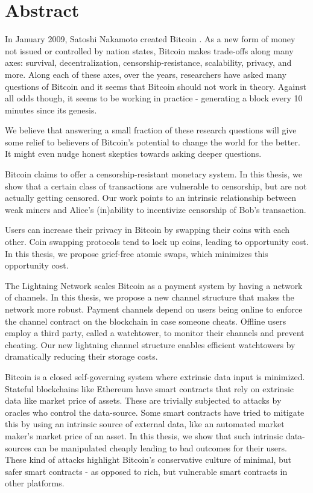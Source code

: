 
\chapter*{Abstract}

In January 2009, Satoshi Nakamoto created Bitcoin \cite{bitcoin_whitepaper}. As a new form of money not issued or controlled by nation states, Bitcoin makes trade-offs along many axes: survival, decentralization, censorship-resistance, scalability, privacy, and more. Along each of these axes, over the years, researchers have asked many questions of Bitcoin and it seems that Bitcoin should not work in theory. Against all odds though, it seems to be working in practice - generating a block every 10 minutes since its genesis.

We believe that answering a small fraction of these research questions will give some relief to believers of Bitcoin's potential to change the world for the better. It might even nudge honest skeptics towards asking deeper questions.

Bitcoin claims to offer a censorship-resistant monetary system. In this thesis, we show that a certain class of transactions are vulnerable to censorship, but are not actually getting censored. Our work points to an intrinsic relationship between weak miners and Alice's (in)ability to incentivize censorship of Bob's transaction.

Users can increase their privacy in Bitcoin by swapping their coins with each other. Coin swapping protocols tend to lock up coins, leading to opportunity cost. In this thesis, we propose grief-free atomic swaps, which minimizes this opportunity cost. 

The Lightning Network scales Bitcoin as a payment system by having a network of channels. In this thesis, we propose a new channel structure that makes the network more robust. Payment channels depend on users being online to enforce the channel contract on the blockchain in case someone cheats. Offline users employ a third party, called a watchtower, to monitor their channels and prevent cheating. Our new lightning channel structure enables efficient watchtowers by dramatically reducing their storage costs. 

Bitcoin is a closed self-governing system where extrinsic data input is minimized. Stateful blockchains like Ethereum have smart contracts that rely on extrinsic data like market price of assets. These are trivially subjected to attacks by oracles who control the data-source. Some smart contracts have tried to mitigate this by using an intrinsic source of external data, like an automated market maker's market price of an asset. In this thesis, we show that such intrinsic data-sources can be manipulated cheaply leading to bad outcomes for their users. These kind of attacks highlight Bitcoin's conservative culture of minimal, but safer smart contracts - as opposed to rich, but vulnerable smart contracts in other platforms.
